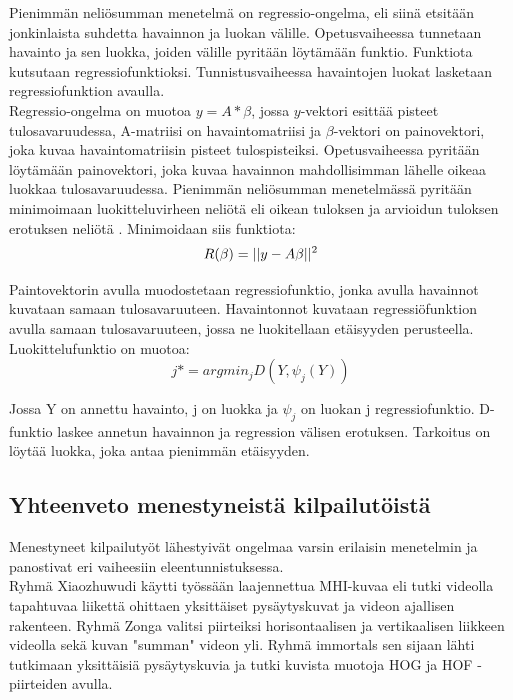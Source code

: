 Pienimmän neliösumman menetelmä on regressio-ongelma, eli siinä etsitään jonkinlaista suhdetta havainnon ja luokan välille. 
Opetusvaiheessa tunnetaan havainto ja sen luokka, joiden välille pyritään löytämään funktio. Funktiota kutsutaan regressiofunktioksi.
Tunnistusvaiheessa havaintojen luokat lasketaan regressiofunktion avaulla.\citep {?}\\

Regressio-ongelma on muotoa $y = A * \beta$, jossa $y$-vektori esittää pisteet tulosavaruudessa, A-matriisi on havaintomatriisi 
ja $\beta$-vektori on painovektori, joka kuvaa havaintomatriisin pisteet tulospisteiksi.
Opetusvaiheessa pyritään löytämään painovektori, joka kuvaa havainnon mahdollisimman lähelle oikeaa luokkaa
tulosavaruudessa. \citep {6239180} Pienimmän neliösumman menetelmässä pyritään minimoimaan luokitteluvirheen neliötä eli oikean tuloksen 
ja arvioidun tuloksen erotuksen neliötä \citep{?}.
Minimoidaan siis funktiota:
\begin{equation}
R(\beta) = ||y-A\beta||^2 \\
\end{equation}

Paintovektorin avulla muodostetaan regressiofunktio, jonka avulla havainnot kuvataan samaan tulosavaruuteen. Havaintonnot kuvataan
regressiöfunktion avulla samaan tulosavaruuteen, jossa ne luokitellaan etäisyyden perusteella. Luokittelufunktio on muotoa:
\begin{equation}
j*=argmin_{j}D(Y,\psi_{j}(Y))
\end{equation}

Jossa Y on annettu havainto, j on luokka ja $\psi_{j}$ on luokan j regressiofunktio. D-funktio laskee annetun havainnon ja regression välisen erotuksen.
Tarkoitus on löytää luokka, joka antaa pienimmän etäisyyden. 
 

\subsection{Yhteenveto menestyneistä kilpailutöistä}
Menestyneet kilpailutyöt lähestyivät ongelmaa varsin erilaisin menetelmin ja panostivat eri vaiheesiin eleentunnistuksessa.\\
 
Ryhmä Xiaozhuwudi käytti työssään laajennettua MHI-kuvaa eli tutki videolla tapahtuvaa liikettä ohittaen yksittäiset pysäytyskuvat ja videon ajallisen rakenteen.
Ryhmä Zonga valitsi piirteiksi horisontaalisen ja vertikaalisen liikkeen videolla sekä kuvan "summan" videon yli. 
Ryhmä immortals sen sijaan lähti tutkimaan yksittäisiä pysäytyskuvia ja tutki kuvista muotoja HOG ja HOF -piirteiden avulla.\\

